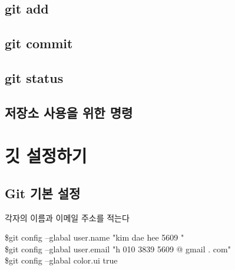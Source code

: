 \documentclass[12pt, a4paper, oneside]{book}
\let\stdsection\section
\renewcommand\section{\newpage\stdsection}
\begin{document}
%	
	\section 	{git add}


%	
	\section 	{git commit}


%	
	\section 	{git status}


%	
	\section 	{저장소 사용을 위한 명령}


	\chapter {깃 설정하기}
	\noptcrule

	\minitoc

%	
	\section 	{ Git 기본 설정}


	각자의 이름과 이메일 주소를 적는다


		\begin{tcolorbox}		[
								colback=red!5!white,
								colframe=red!75!black,
								title=깃 기본 설정
								]
			\$git config --glabal user.name  "kim dae hee 5609 " \\
			\$git config --glabal user.email  "h 010 3839 5609 @ gmail . com" \\
			\$git config --glabal color.ui true
		\end{tcolorbox}
\end{document}
